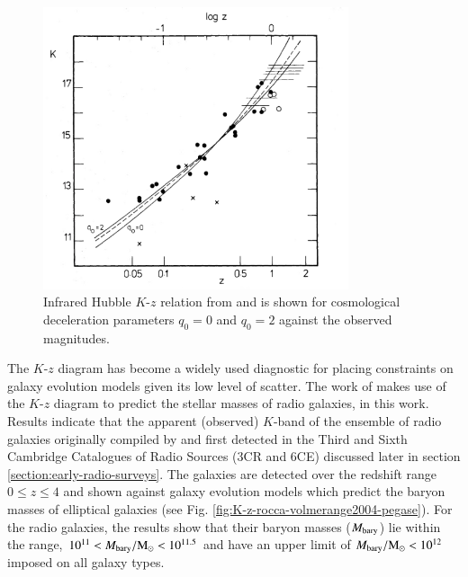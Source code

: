 \begin{figure}[!ht]
    \centering
    \includegraphics[width=0.8\textwidth]{plots_chp1/K_z_Lill1982.png}
    \caption[Near-infrared Hubble $K$-$z$ diagram \citep{LillyLongair1982}]{Infrared Hubble $K$-$z$ relation from \citet{LillyLongair1982} and is shown for cosmological deceleration parameters $q_0=0$ and $q_0=2$ against the observed magnitudes.}
    \label{fig:K-z-Lilly1984}
\end{figure}

The $K$-$z$ diagram has become a widely used diagnostic for placing constraints on galaxy evolution models given its low level of scatter. The work of \citet{rocca-volmerange2004} makes use of the $K$-$z$ diagram to predict the stellar masses of radio galaxies, in this work. Results indicate that the apparent (observed) $K$-band of the ensemble of radio galaxies originally compiled by \citet{debreuck2002a} and first detected in the Third and Sixth Cambridge Catalogues of Radio Sources (3CR and 6CE) discussed later in section \ref{section:early-radio-surveys}. The galaxies are detected over the redshift range $0 \leq z \leq 4$ and shown against galaxy evolution models which predict the baryon masses of elliptical galaxies (see Fig. \ref{fig:K-z-rocca-volmerange2004-pegase}). For the radio galaxies, the results show that their baryon masses ($M_{\rm bary}$) lie within the range, $10^{11} < M_{\rm bary}/\rm{M}_\odot < 10^{11.5}$ and have an upper limit of $M_{\rm bary}/\rm{M}_\odot < 10^{12}$ imposed on all galaxy types. 

